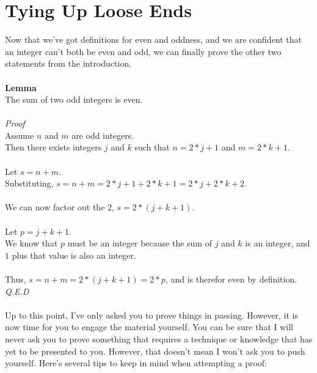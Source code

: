 \documentclass[a4paper,12pt]{article}
\begin{document}
\section{Tying Up Loose Ends}
Now that we've got definitions for even and oddness, and we are confident that an integer can't both be even and odd, we can finally prove the other two statements from the introduction.\\
\\
\textbf{Lemma}\\  
The sum of two odd integers is even.\\
\\
\textit{Proof}\\
Assume $n$ and $m$ are odd integers.\\
Then there exists integers $j$ and $k$ such that $n = 2*j + 1$ and $m = 2*k + 1$.\\
\\
Let $s = n + m$.\\
Substituting, $s = n + m = 2*j + 1 + 2*k + 1 = 2*j + 2*k + 2$.\\
\\
We can now factor out the $2$, $s = 2*(j + k + 1)$.\\
\\
Let $p = j + k + 1$.\\
We know that $p$ must be an integer because the sum of $j$ and $k$ is an integer, and $1$ plus that value is also an integer.\\
\\
Thus, $s = n + m = 2*(j + k + 1) = 2*p$, and is therefor even by definition.\\
\textit{Q.E.D}\\
\\
Up to this point, I've only asked you to prove things in passing. However, it is now time for you to engage the material yourself. You can be sure that I will never ask you to prove something that requires a technique or knowledge that has yet to be presented to you. However, that doesn't mean I won't ask you to push yourself. Here's several tips to keep in mind when attempting a proof:
\end{document}
